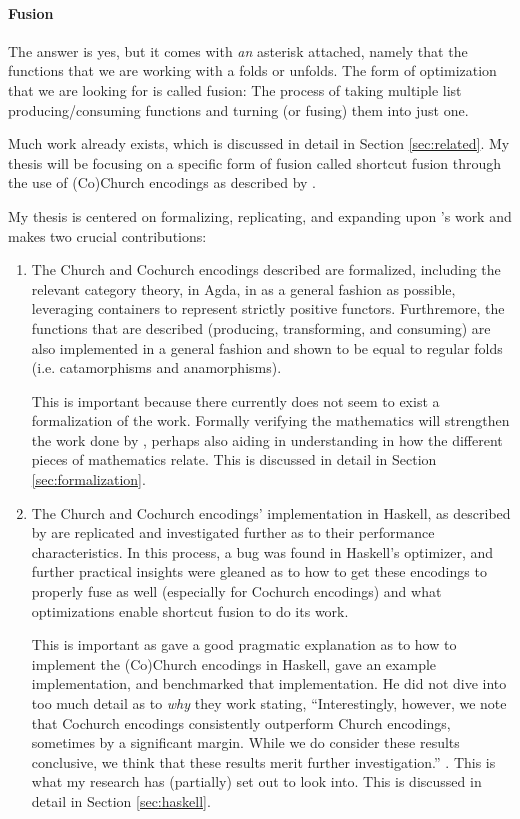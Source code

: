 \paragraph{Fusion}
The answer is yes{\Large*}, but it comes with \textit{an} asterisk attached, namely that the functions that we are working with a folds or unfolds.
The form of optimization that we are looking for is called fusion:
The process of taking multiple list producing/consuming functions and turning (or fusing) them into just one.

Much work already exists, which is discussed in detail in Section \ref{sec:related}.
My thesis will be focusing on a specific form of fusion called shortcut fusion through the use of (Co)Church encodings as described by \cite{Harper2011}.

My thesis is centered on formalizing, replicating, and expanding upon \cite{Harper2011}'s work and makes two crucial contributions:
\begin{enumerate}
    \item The Church and Cochurch encodings described are formalized, including the relevant category theory, in Agda, in as a general fashion as possible, leveraging containers \citep{Abbott2005} to represent strictly positive functors.
    Furthremore, the functions that are described (producing, transforming, and consuming) are also implemented in a general fashion and shown to be equal to regular folds (i.e. catamorphisms and anamorphisms).

    This is important because there currently does not seem to exist a formalization of the work.
    Formally verifying the mathematics will strengthen the work done by \cite{Harper2011}, perhaps also aiding in understanding in how the different pieces of mathematics relate.
    This is discussed in detail in Section \ref{sec:formalization}.
    \item The Church and Cochurch encodings' implementation in Haskell, as described by \cite{Harper2011} are replicated and investigated further as to their performance characteristics.
    In this process, a bug was found in Haskell's optimizer, and further practical insights were gleaned as to how to get these encodings to properly fuse as well (especially for Cochurch encodings) and what optimizations enable shortcut fusion to do its work.

    This is important as \cite{Harper2011} gave a good pragmatic explanation as to how to implement the (Co)Church encodings in Haskell, gave an example implementation, and benchmarked that implementation.
    He did not dive into too much detail as to \textit{why} they work stating, ``Interestingly, however, we note that Cochurch encodings consistently outperform Church encodings, sometimes by a significant margin. While we do consider these results conclusive, we think that these results merit further investigation.'' \citep{Harper2011}.
    This is what my research has (partially) set out to look into.
    This is discussed in detail in Section \ref{sec:haskell}.
\end{enumerate}




